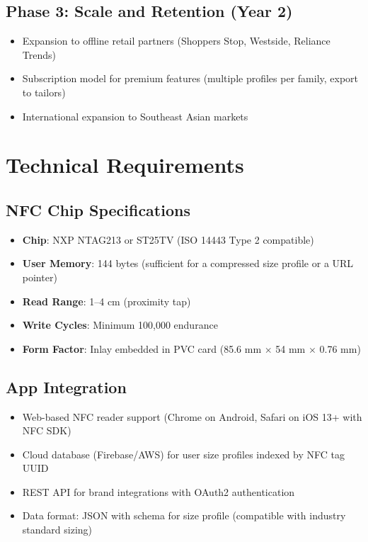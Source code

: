 \documentclass[12pt,a4paper]{article}
\begin{document}
\subsection{Phase 3: Scale and Retention (Year 2)}
\begin{itemize}
    \item Expansion to offline retail partners (Shoppers Stop, Westside, Reliance Trends)
    \item Subscription model for premium features (multiple profiles per family, export to tailors)
    \item International expansion to Southeast Asian markets
\end{itemize}

\section{Technical Requirements}

\subsection{NFC Chip Specifications}
\begin{itemize}
    \item \textbf{Chip}: NXP NTAG213 or ST25TV (ISO 14443 Type 2 compatible)
    \item \textbf{User Memory}: 144 bytes (sufficient for a compressed size profile or a URL pointer)
    \item \textbf{Read Range}: 1--4 cm (proximity tap)
    \item \textbf{Write Cycles}: Minimum 100,000 endurance
    \item \textbf{Form Factor}: Inlay embedded in PVC card (85.6 mm $\times$ 54 mm $\times$ 0.76 mm)
\end{itemize}

\subsection{App Integration}
\begin{itemize}
    \item Web-based NFC reader support (Chrome on Android, Safari on iOS 13+ with NFC SDK)
    \item Cloud database (Firebase/AWS) for user size profiles indexed by NFC tag UUID
    \item REST API for brand integrations with OAuth2 authentication
    \item Data format: JSON with schema for size profile (compatible with industry standard sizing)
\end{itemize}
\end{document}
